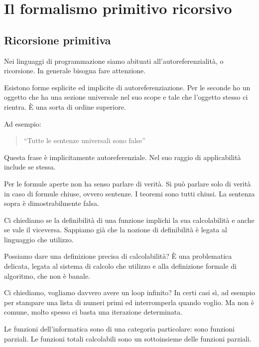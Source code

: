 \chapter{Il formalismo primitivo ricorsivo}

\section{Ricorsione primitiva}

Nei linguaggi di programmazione siamo abituati all'autoreferenzialità, o ricorsione. In generale
bisogna fare attenzione.

Esistono forme esplicite ed implicite di autoreferenziazione. Per le seconde ho un oggetto che ha
una sezione universale nel suo scope e tale che l'oggetto stesso ci rientra. È una sorta di ordine
superiore.

Ad esempio:
\begin{quote}
    ``Tutte le sentenze universali sono false''
\end{quote}

Questa frase è implicitamente autoreferenziale. Nel suo raggio di applicabilità include se stessa.

Per le formule aperte non ha senso parlare di verità. Si può parlare solo di verità in caso di
formule chiuse, ovvero sentenze. I teoremi sono tutti chiusi. La sentenza sopra è dimostrabilmente falsa.

Ci chiediamo se la definibilità di una funzione implichi la sua calcolabilità e anche se vale il 
viceversa. Sappiamo già che la nozione di definibilità è legata al linguaggio che utilizzo.

Possiamo dare una definizione precisa di calcolabilità? È una problematica delicata, legata al
sistema di calcolo che utilizzo e alla definizione formale di algoritmo, che non è banale.


Ci chiediamo, vogliamo davvero avere un loop infinito? In certi casi sì, ad esempio per stampare
una lista di numeri primi ed interromperla quando voglio. Ma non è comune, molto spesso ci basta
una iterazione determinata.

Le funzioni dell'informatica sono di una categoria particolare: sono funzioni parziali. Le funzioni
totali calcolabili sono un sottoinsieme delle funzioni parziali.

